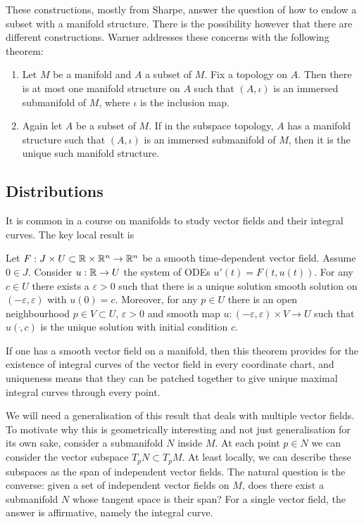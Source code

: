 These constructions, mostly from Sharpe, answer the question of how to endow a subset with a manifold structure.
There is the possibility however that there are different constructions.
Warner addresses these concerns with the following theorem: 
\begin{theorem}\label{thm:submanifolds}
\textup{\cite[Remark~1.33]{Warner1983}}
\begin{enumerate}
\item Let $M$ be a manifold and $A$ a subset of $M$. Fix a topology on $A$. Then there is at most one manifold structure on $A$ such that $(A,\iota)$ is an immersed submanifold of $M$, where $\iota$ is the inclusion map.
\item Again let $A$ be a subset of $M$. If in the subspace topology, $A$ has a manifold structure such that $(A,\iota)$ is an immersed submanifold of $M$, then it is the unique such manifold structure.
\end{enumerate}
\end{theorem}

\subsection{Distributions}

It is common in a course on manifolds to study vector fields and their integral curves.
The key local result is
\begin{theorem}
Let $F : J \times U \subset \mathbb{R}\times\mathbb{R}^n \to \mathbb{R}^n$ be a smooth time-dependent vector field. 
Assume $0 \in J$. 
Consider $u : \mathbb{R} \to U$ the system of ODEs $u'(t) = F(t,u(t))$.
For any $c \in U$ there exists a $\varepsilon > 0$ such that there is a unique solution smooth solution on $(-\varepsilon,\varepsilon)$ with $u(0) = c$.
Moreover, for any $p \in U$ there is an open neighbourhood $p \in V \subset U$, $\varepsilon > 0$ and smooth map $u : (-\varepsilon,\varepsilon) \times V \to U$ such that $u(\dot,c)$ is the unique solution with initial condition $c$.
\\\textup{\cite[Theorem~2.1.1]{Sharpe1997}}\cite[Theorem~1.2.1]{Ivey}
\end{theorem}

If one has a smooth vector field on a manifold, then this theorem provides for the existence of integral curves of the vector field in every coordinate chart, and uniqueness means that they can be patched together to give unique maximal integral curves through every point.

We will need a generalisation of this result that deals with multiple vector fields.
To motivate why this is geometrically interesting and not just generalisation for its own sake, consider a submanifold $N$ inside $M$.
At each point $p \in N$ we can consider the vector subspace $T_pN \subset T_pM$.
At least locally, we can describe these subspaces as the span of independent vector fields.
The natural question is the converse: given a set of independent vector fields on $M$, does there exist a submanifold $N$ whose tangent space is their span?
For a single vector field, the answer is affirmative, namely the integral curve.

